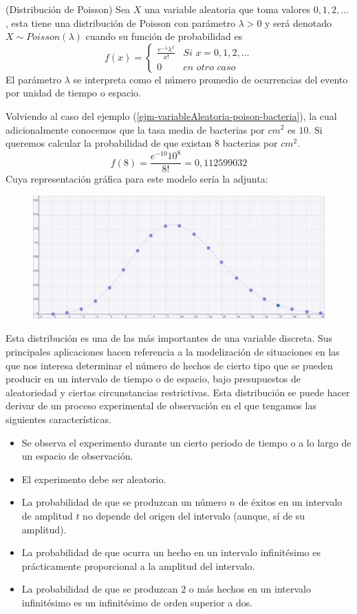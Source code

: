 \begin{Def}(Distribución de Poisson)
    Sea $X$ una variable aleatoria que toma valores $0,1,2,\ldots$ , esta tiene una distribución de Poisson con parámetro $\lambda>0$ y será denotado $X\sim Poisson(\lambda)$ cuando su función de probabilidad es
    $$f(x)=\begin{cases}\frac{e^{-\lambda}\lambda^x}{x!}& \textit{Si }x=0,1,2,\ldots\\
    0 &\textit{en otro caso}
    \end{cases}$$
    El parámetro $\lambda$ se interpreta como el número promedio de ocurrencias del evento por unidad de tiempo o espacio.
\end{Def}
\begin{Ejm}
    Volviendo al caso del ejemplo (\ref{ejm-variableAleatoria-poison-bacteria}), la cual adicionalmente conocemos que la tasa media de bacterias por $cm^2$ es $10$. Si queremos  calcular la probabilidad de que existan $8$ bacterias por $cm^2$.
    $$f(8)=\frac{e^{-10} 10^{8}}{8!}=  0,112599032 $$ Cuya representación gráfica para este modelo sería la adjunta:
    \begin{figure}
        \includegraphics[width=15cm]{Cap1-Probabilidad/img/poisson.png}
    \end{figure}
\end{Ejm}
Esta distribución es una de las más importantes de una variable discreta. Sus principales aplicaciones hacen referencia a la modelización de situaciones en las que nos interesa determinar el número de hechos de cierto tipo que se pueden producir en un intervalo de tiempo o de espacio, bajo presupuestos de aleatoriedad y ciertas circunstancias restrictivas.
Esta distribución se puede hacer derivar de un proceso experimental de observación en el que tengamos las siguientes características.
\begin{itemize}
    \item Se observa el experimento durante un cierto periodo de tiempo o a lo largo de un espacio de observación.
    \item El experimento debe ser aleatorio.
    \item La probabilidad de que se produzcan un número $n$ de éxitos en un intervalo de amplitud $t$ no depende del origen del intervalo (aunque, sí de su amplitud).
    \item La probabilidad de que ocurra un hecho en un intervalo infinitésimo es prácticamente proporcional a la amplitud del intervalo.
    \item La probabilidad de que se produzcan $2$ o más hechos en un intervalo infinitésimo es un infinitésimo de orden superior a dos.
\end{itemize}
